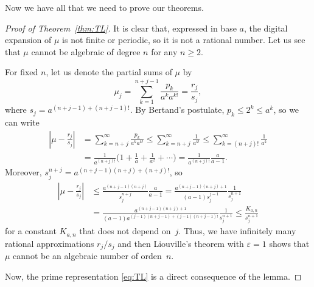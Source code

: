 \documentclass{article}
\theoremstyle{plain}
\begin{document}
Now we have all that we need to prove our theorems.

\begin{proof}[Proof of Theorem~\ref{thm:TL}]
It is clear that, expressed in base $a$, the digital expansion of $\mu$ is not finite or periodic, so it is not a rational number. Let us see that $\mu$ cannot be algebraic of degree $n$ for any $n \ge 2$.

For fixed $n$, let us denote the partial sums of $\mu$ by
\[
  \mu_j = \sum_{k=1}^{n+j-1} \frac{p_k}{a^k a^{k!}} = \frac{r_j}{s_j},
\]
where 
$s_j = a^{(n+j-1)+(n+j-1)!}$. 
By Bertand's postulate, $p_k \le 2^k \le a^k$, so we can write 
\begin{align*}
  \left| \mu - \frac{r_j}{s_j} \right|
  &= \sum_{k=n+j}^{\infty} \frac{p_k}{a^k a^{k!}} 
  \le \sum_{k=n+j}^{\infty} \frac{1}{a^{k!}} \le \sum_{k=(n+j)!}^{\infty} \frac{1}{a^{k}} \\
  &= \frac{1}{a^{(n+j)!}} \bigg( 1 + \frac{1}{a} + \frac{1}{a^2} + \cdots \bigg) 
  = \frac{1}{a^{(n+j)!}} \frac{a}{a-1}.
\end{align*}
Moreover, $s_j^{n+j} = a^{(n+j-1)(n+j)+(n+j)!}$, so
\begin{align*}
  \left| \mu - \frac{r_j}{s_j} \right| 
  &\le \frac{a^{(n+j-1)(n+j)}}{s_j^{n+j}} \frac{a}{a-1}
  = \frac{a^{(n+j-1)(n+j)+1}}{(a-1)s_j^{j-1}} \frac{1}{s_j^{n+1}} \\
  &= \frac{a^{(n+j-1)(n+j)+1}}{(a-1)a^{(j-1)(n+j-1)+(j-1)(n+j-1)!}} \frac{1}{s_j^{n+1}}
  \le \frac{K_{a,n}}{s_j^{n+1}} 
\end{align*}
for a constant $K_{a,n}$ that does not depend on~$j$.
Thus, we have infinitely many rational approximations $r_j/s_j$ and then Liouville's theorem with $\varepsilon=1$ shows that $\mu$ cannot be an algebraic number of orden~$n$.

Now, the prime representation \eqref{eq:TL} is a direct consequence of the lemma.
\end{proof}
\end{document}
